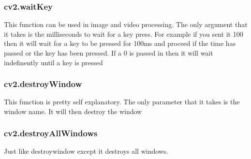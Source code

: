 \documentclass[fleqn]{article}
\begin{document}
    \subsubsection{cv2.waitKey}
    This function can be used in image and video processing. The only argument that it takes is the milliseconds to wait for a key press. For example if you sent it 100 then it will wait for a key to be pressed for 100ms and proceed if the time has passed or the key has been pressed. If a 0 is passed in then it will wait indefinently until a key is pressed
    \subsubsection{cv2.destroyWindow}
    This function is pretty self explanatory. The only parameter that it takes is the window name. It will then destroy the window
    \subsubsection{cv2.destroyAllWindows}
    Just like destroywindow except it destroys all windows. 
\end{document}

